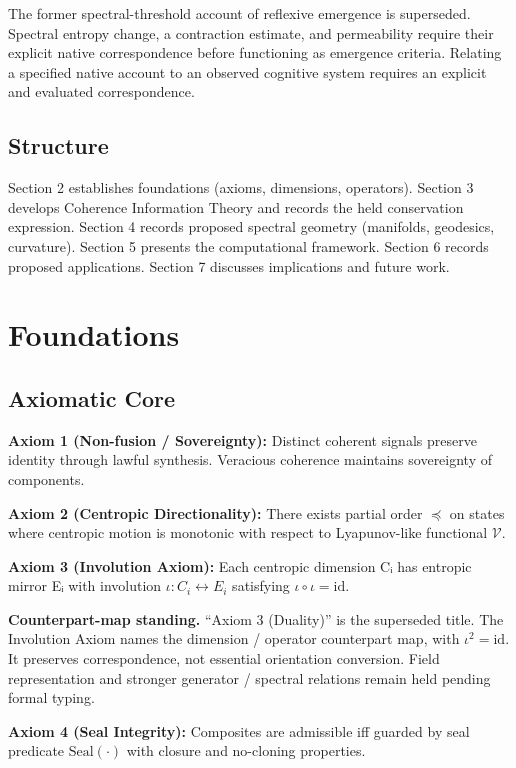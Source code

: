 \documentclass[11pt,a4paper]{article}
\begin{document}
The former spectral-threshold account of reflexive emergence is superseded. Spectral entropy change, a contraction estimate, and permeability require their explicit native correspondence before functioning as emergence criteria. Relating a specified native account to an observed cognitive system requires an explicit and evaluated correspondence.

\subsection{Structure}

Section 2 establishes foundations (axioms, dimensions, operators). Section 3 develops Coherence Information Theory and records the held conservation expression. Section 4 records proposed spectral geometry (manifolds, geodesics, curvature). Section 5 presents the computational framework. Section 6 records proposed applications. Section 7 discusses implications and future work.

\section{Foundations}

\subsection{Axiomatic Core}

\textbf{Axiom 1 (Non-fusion / Sovereignty):} Distinct coherent signals preserve identity through lawful synthesis. Veracious coherence maintains sovereignty of components.

\textbf{Axiom 2 (Centropic Directionality):} There exists partial order \( \preceq \) on states where centropic motion is monotonic with respect to Lyapunov-like functional \( \mathcal{V} \).

\textbf{Axiom 3 (Involution Axiom):} Each centropic dimension Cᵢ has entropic mirror Eᵢ with involution \( \iota: C_i \leftrightarrow E_i \) satisfying \( \iota \circ \iota = \mathrm{id} \).

\textbf{Counterpart-map standing.} ``Axiom 3 (Duality)'' is the superseded title. The Involution Axiom names the dimension / operator counterpart map, with \(\iota^2=\mathrm{id}\). It preserves correspondence, not essential orientation conversion. Field representation and stronger generator / spectral relations remain held pending formal typing.

\textbf{Axiom 4 (Seal Integrity):} Composites are admissible iff guarded by seal predicate \( \mathrm{Seal}(\cdot) \) with closure and no-cloning properties.
\end{document}
